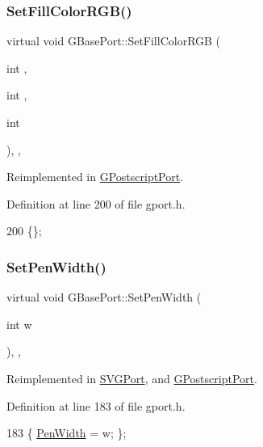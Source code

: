 \subsubsection{\texorpdfstring{Set\+Fill\+Color\+R\+G\+B()}{SetFillColorRGB()}}
{\footnotesize\ttfamily virtual void G\+Base\+Port\+::\+Set\+Fill\+Color\+R\+GB (\begin{DoxyParamCaption}\item[{int}]{,  }\item[{int}]{,  }\item[{int}]{ }\end{DoxyParamCaption})\hspace{0.3cm}{\ttfamily [inline]}, {\ttfamily [virtual]}, {\ttfamily [inherited]}}



Reimplemented in \mbox{\hyperlink{class_g_postscript_port_ad8157268c1db4307eca36108fdc1aa1e}{G\+Postscript\+Port}}.



Definition at line 200 of file gport.\+h.


\begin{DoxyCode}
200 \{\};
\end{DoxyCode}
\mbox{\label{class_g_base_port_aa2fd1fbe050cfea5a21afb7d4cecaa61}} 
\subsubsection{\texorpdfstring{Set\+Pen\+Width()}{SetPenWidth()}}
{\footnotesize\ttfamily virtual void G\+Base\+Port\+::\+Set\+Pen\+Width (\begin{DoxyParamCaption}\item[{int}]{w }\end{DoxyParamCaption})\hspace{0.3cm}{\ttfamily [inline]}, {\ttfamily [virtual]}, {\ttfamily [inherited]}}



Reimplemented in \mbox{\hyperlink{class_s_v_g_port_a3dbd4c8a9df41ccd1d05d362cec289a5}{S\+V\+G\+Port}}, and \mbox{\hyperlink{class_g_postscript_port_a63e3cf185f620f9f24ec40f01dc3b02c}{G\+Postscript\+Port}}.



Definition at line 183 of file gport.\+h.


\begin{DoxyCode}
183 \{ \mbox{\hyperlink{class_g_base_port_a9a76c3a8af8d0e9f29035d02d8f038c1}{PenWidth}} = w; \};
\end{DoxyCode}
\mbox{\label{class_g_base_port_aad9e21ed63c4f04a508e30b7f100fba5}} 
